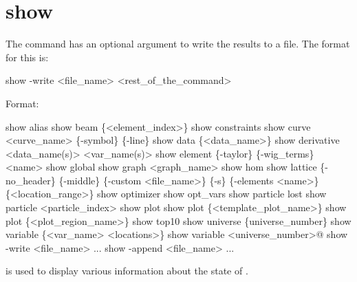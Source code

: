 \section{show}
\label{s:show}

The  command has an optional argument to write the results to a file.
The format for this is:
\begin{example}
  show -write <file_name> <rest_of_the_command>
\end{example}

Format:
\begin{example}
  show alias 
  show beam \{<element_index>\}
  show constraints
  show curve <curve_name> \{-symbol\} \{-line\}
  show data \{<data_name>\} 
  show derivative <data_name(s)> <var_name(s)>
  show element \{-taylor\} \{-wig_terms\} <name>
  show global
  show graph <graph_name>
  show hom
  show lattice \{-no_header\} \{-middle\} \{-custom <file_name>\} 
                            \{-s\} \{-elements <name>\} \{<location_range>\}
  show optimizer
  show opt_vars
  show particle lost
  show particle <particle_index>
  show plot
  show plot \{<template_plot_name>\}
  show plot \{<plot_region_name>\}
  show top10
  show universe \{universe_number\}
  show variable \{<var_name> <locations>\}
  show variable <universe_number>@
  show -write <file_name> ...
  show -append <file_name> ...
\end{example}

\vskip 0.2in 
 is used to display various information about
the state of \tao. 

